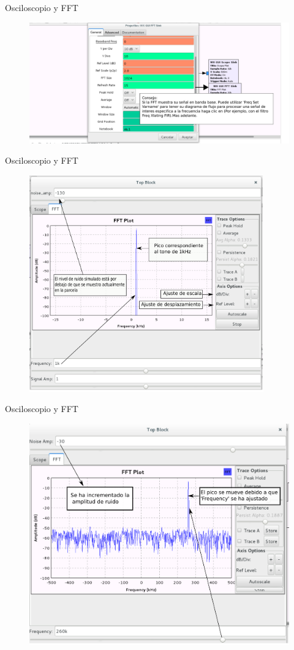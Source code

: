 \begin{frame}{Osciloscopio y FFT}
\begin{figure}[H]
\centering
\includegraphics[width=\textwidth]{lab2/pdf/lab209.pdf}
\end{figure}
\end{frame}

\begin{frame}{Osciloscopio y FFT}
\begin{figure}[H]
\centering
\includegraphics[width=0.9\textwidth, height=0.55\textwidth]{lab2/pdf/lab210.pdf}
\end{figure}
\end{frame}

\begin{frame}{Osciloscopio y FFT}
\begin{figure}[H]
\centering
\includegraphics[width=\textwidth, height=0.55\textwidth]{lab2/pdf/lab211.pdf}
\end{figure}
\end{frame}

